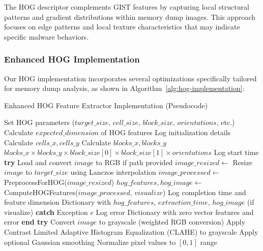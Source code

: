 The HOG descriptor complements GIST features by capturing local structural patterns and gradient distributions within memory dump images. This approach focuses on edge patterns and local texture characteristics that may indicate specific malware behaviors.

\subsubsection{Enhanced HOG Implementation}

Our HOG implementation incorporates several optimizations specifically tailored for memory dump analysis, as shown in Algorithm~\ref{alg:hog-implementation}:

\begin{algorithm}[!htbp]
\caption{Enhanced HOG Feature Extractor Implementation (Pseudocode)}
\label{alg:hog-implementation}
\begin{algorithmic}[1]
    \State Set HOG parameters ($target\_size$, $cell\_size$, $block\_size$, $orientations$, etc.)
    \State Calculate $expected\_dimension$ of HOG features
    \State Log initialization details
\EndProcedure
\Statex
{}
    \State Calculate $cells\_x, cells\_y$
    \State Calculate $blocks\_x, blocks\_y$
    \Return $blocks\_x \times blocks\_y \times block\_size[0] \times block\_size[1] \times orientations$
\EndFunction
\Statex
{}
    \State Log start time
    \State \textbf{try}
        \State Load and convert $image$ to RGB if path provided
        \State $image\_resized \leftarrow$ Resize $image$ to $target\_size$ using Lanczos interpolation
        \State $image\_processed \leftarrow$ PreprocessForHOG($image\_resized$)
        \State $hog\_features, hog\_image \leftarrow$ ComputeHOGFeatures($image\_processed$, $visualize$)
        \State Log completion time and feature dimension
        \Return Dictionary with $hog\_features$, $extraction\_time$, $hog\_image$ (if visualize)
    \State \textbf{catch} {Exception $e$}
        \State Log error
        \Return Dictionary with zero vector features and error
    \State \textbf{end try}
\EndProcedure
\Statex
{}
    \State Convert $image$ to grayscale (weighted RGB conversion)
    \State Apply Contrast Limited Adaptive Histogram Equalization (CLAHE) to grayscale
    \State Apply optional Gaussian smoothing
    \State Normalize pixel values to $[0, 1]$ range

\end{algorithmic}
\end{algorithm}
